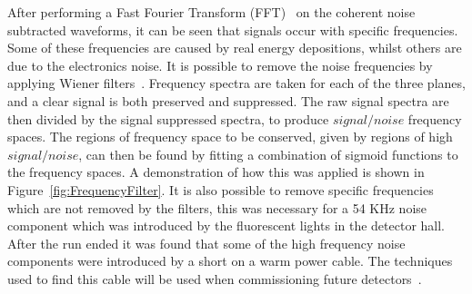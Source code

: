After performing a Fast Fourier Transform (FFT)~\citep{CoTuFFT} on the coherent noise subtracted waveforms, it can be seen that signals occur with specific frequencies. Some of these frequencies are caused by real energy depositions, whilst others are due to the electronics noise. It is possible to remove the noise frequencies by applying Wiener filters~\citep{WienerFilter}. Frequency spectra are taken for each of the three planes, and a clear signal is both preserved and suppressed. The raw signal spectra are then divided by the signal suppressed spectra, to produce $signal/noise$ frequency spaces. The regions of frequency space to be conserved, given by regions of high $signal/noise$, can then be found by fitting a combination of sigmoid functions to the frequency spaces. A demonstration of how this was applied is shown in Figure~\ref{fig:FrequencyFilter}. It is also possible to remove specific frequencies which are not removed by the filters, this was necessary for a 54 KHz noise component which was introduced by the fluorescent lights in the detector hall. After the run ended it was found that some of the high frequency noise components were introduced by a short on a warm power cable. The techniques used to find this cable will be used when commissioning future detectors~\citep{35tonNoiseMeeting}. \\

